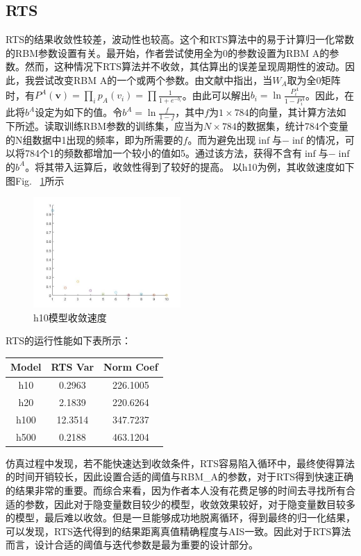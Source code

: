 \documentclass[journal,a4paper]{IEEEtran}
\begin{document}
	\subsection{RTS}
		RTS的结果收敛性较差，波动性也较高。这个和RTS算法中的易于计算归一化常数的RBM参数设置有关。最开始，作者尝试使用全为0的参数设置为RBM A的参数。然而，这种情况下RTS算法并不收敛，其估算出的误差呈现周期性的波动。因此，我尝试改变RBM A的一个或两个参数。由文献\cite{salakhutdinov2009learning}中指出，当$W_A$取为全0矩阵时，有$P^A(\mathbf{v})=\prod_ip_A(v_i)=\prod\frac{1}{1+e^{-b_i}}$。由此可以解出$b_i = \ln \frac{P_i^A}{1-P_i^A}$。因此，在此将$b^A$设定为如下的值。令$b^A=\ln \frac{f}{1-f}$，其中$f$为$1\times784$的向量，其计算方法如下所述。读取训练RBM参数的训练集，应当为$N\times784$的数据集，统计784个变量的N组数据中1出现的频率，即为所需要的$f$。而为避免出现$\inf$与$-\inf$的情况，可以将784个1的频数都增加一个较小的值如5。通过该方法，获得不含有$\inf$与$-\inf$的$b^A$。将其带入运算后，收敛性得到了较好的提高。
		以h10为例，其收敛速度如下图Fig. ~\ref{fig6}所示
		
		\begin{figure}[h]
			\includegraphics[width = 0.5\textwidth]{6.jpg}
			\caption{h10模型收敛速度}
			\label{fig6}
		\end{figure}
	
		RTS的运行性能如下表所示：
		\begin{center}
		\begin{tabular}{c|cc}
	\hline
	Model & RTS Var & Norm Coef \\
	\hline
	h10 & 0.2963 & 226.1005\\
	h20 & 2.1839 & 220.6264\\
	h100 & 12.3514 & 347.7237\\
	h500 & 0.2188 & 463.1204\\
	\hline
\end{tabular}
		\end{center}
		
		仿真过程中发现，若不能快速达到收敛条件，RTS容易陷入循环中，最终使得算法的时间开销较长，因此设置合适的阈值与RBM\_A的参数，对于RTS得到快速正确的结果非常的重要。而综合来看，因为作者本人没有花费足够的时间去寻找所有合适的参数，因此对于隐变量数目较少的模型，收敛效果较好，对于隐变量数目较多的模型，最后难以收敛。但是一旦能够成功地脱离循环，得到最终的归一化结果，可以发现，RTS迭代得到的结果距离真值精确程度与AIS一致。因此对于RTS算法而言，设计合适的阈值与迭代参数是最为重要的设计部分。
		
\end{document}
